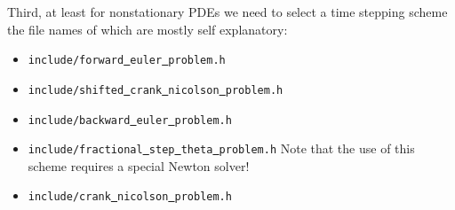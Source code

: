 Third, at least for nonstationary PDEs we need to select a time stepping scheme
the file names of which are mostly self explanatory:
\begin{itemize}
\item {\tt include/forward\underline{ }euler\underline{ }problem.h}
\item {\tt include/shifted\underline{ }crank\underline{ }nicolson\underline{ }problem.h}
\item {\tt include/backward\underline{ }euler\underline{ }problem.h}
\item {\tt include/fractional\underline{ }step\underline{ }theta\underline{ }problem.h} Note that the use of this scheme requires a special Newton solver!
\item {\tt include/crank\underline{ }nicolson\underline{ }problem.h}
\end{itemize}

